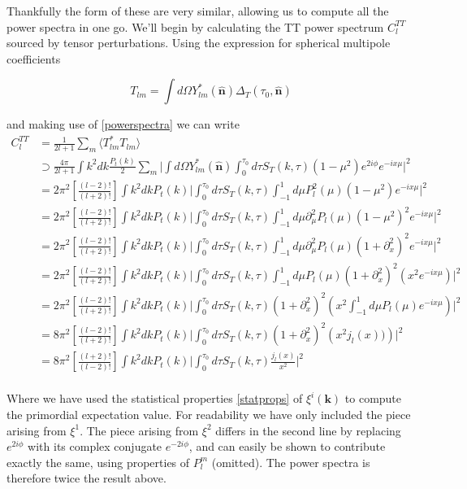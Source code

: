 \documentclass[a4paper,10pt]{article}
\renewcommand{\v}[1]{\mathbf{#1}}
\newcommand{\unit}[1]{\hat{\v{#1}}}
\newcommand{\ltwo}{\left[\frac{(l+2)!}{(l-2)!}\right]}
\newcommand{\ltwof}{\left[\frac{(l-2)!}{(l+2)!}\right]}
\begin{document}
Thankfully the form of these are very similar, allowing us to compute all the power spectra in one go. We'll begin by calculating the TT power spectrum $C_l^{TT}$ sourced by tensor perturbations. Using the expression for spherical multipole coefficients 

\begin{equation}
T_{lm} = \int d\Omega Y_{lm}^*(\unit{n})\Delta_T(\tau_0,\unit{n})
\end{equation}

and making use of \ref{powerspectra} we can write 
\begin{equation}\begin{split}
C_l^{TT} &= \frac{1}{2l+1}\sum_m \langle T_{lm}^*T_{lm} \rangle \\
&\supset \frac{4\pi}{2l+1} \int k^2 dk \frac{P_t(k)}{2} \sum_m \bigg| \int d\Omega Y^*_{lm}(\unit{n}) \int_0^{\tau_0} d\tau  S_T(k,\tau)(1-\mu^2)e^{2i\phi}e^{-ix\mu} \bigg|^2\\
&= 2\pi^2\ltwof \int k^2 dk P_t(k) \bigg|  \int_0^{\tau_0} d\tau  S_T(k,\tau)\int_{-1}^1 d\mu P_l^2(\mu)(1-\mu^2)e^{-ix\mu} \bigg|^2\\
&= 2\pi^2\ltwof \int k^2 dk P_t(k) \bigg|  \int_0^{\tau_0} d\tau  S_T(k,\tau)\int_{-1}^1 d\mu \partial_\mu^2P_l(\mu)(1-\mu^2)^2e^{-ix\mu}\bigg|^2\\
&= 2\pi^2\ltwof \int k^2 dk P_t(k) \bigg|  \int_0^{\tau_0} d\tau  S_T(k,\tau)\int_{-1}^1 d\mu \partial_\mu^2P_l(\mu)(1+\partial_x^2)^2e^{-ix\mu} \bigg|^2\\
&= 2\pi^2\ltwof \int k^2 dk P_t(k) \bigg|  \int_0^{\tau_0} d\tau  S_T(k,\tau)\int_{-1}^1 d\mu P_l(\mu)(1+\partial_x^2)^2(x^2e^{-ix\mu}) \bigg|^2\\
&= 2\pi^2\ltwof \int k^2 dk P_t(k) \bigg|  \int_0^{\tau_0} d\tau  S_T(k,\tau)(1+\partial_x^2)^2\left(x^2 \int_{-1}^1 d\mu P_l(\mu)e^{-ix\mu} \right)\bigg|^2\\
&= 8\pi^2\ltwof \int k^2 dk P_t(k) \bigg|  \int_0^{\tau_0} d\tau  S_T(k,\tau) (1+\partial_x^2)^2\left(x^2j_l(x)) \right)\bigg|^2\\
&= 8\pi^2\ltwo \int k^2 dk P_t(k) \bigg|  \int_0^{\tau_0} d\tau  S_T(k,\tau)\frac{j_l(x)}{x^2} \bigg|^2\\
\end{split}\end{equation}

Where we have used the statistical properties \ref{statprops} of $\xi^i(\v{k})$ to compute the primordial expectation value. For readability we have only included the piece arising from $\xi^1$. The piece arising from $\xi^2$ differs in the second line by replacing $e^{2i\phi}$ with its complex conjugate $e^{-2i\phi}$, and can easily be shown to contribute exactly the same, using properties of $P_l^m$ (omitted). The power spectra is therefore twice the result above.\\
\end{document}
